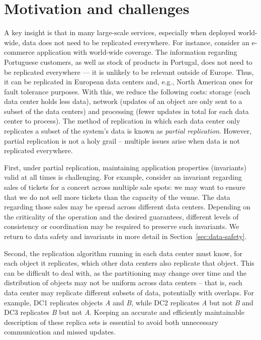 \section{Motivation and challenges}
A key insight is that in many large-scale services, especially when deployed world-wide,
data does not need to be replicated everywhere.
For instance, consider an e-commerce application with world-wide coverage.
The information regarding Portuguese customers, as well as stock of products in Portugal,
does not need to be replicated everywhere --- it is unlikely to be relevant outside of Europe.
Thus, it can be replicated in European data centers and, e.g., North American ones for fault tolerance purposes.
With this, we reduce the following costs: storage (each data center holds less data), network (updates of an object are only
sent to a subset of the data centers) and processing (fewer updates in total for each data center to process).
The method of replication in which each data center only replicates a subset of the system's data is known as
\emph{partial replication}.
However, partial replication is not a holy grail -- multiple issues arise when data is not replicated everywhere.

First, under partial replication, maintaining application properties (invariants) valid at all times is challenging.
For example, consider an invariant regarding sales of tickets for a concert across multiple sale spots: we may want to ensure that
we do not sell more tickets than the capacity of the venue.
The data regarding those sales may be spread across different data centers.
Depending on the criticality of the operation and the desired guarantees, different levels of consistency or coordination may be
required to preserve such invariants.
We return to data safety and invariants in more detail in Section~\ref{sec:data-safety}.%

Second, the replication algorithm running in each data center must know, for each
object it replicates, which other data centers also replicate that object.
This can be difficult to deal with, as the partitioning may change over time and the distribution of objects
may not be uniform across data centers -- that is, each data center may replicate different subsets of data, potentially
with overlaps.
For example, DC1 replicates objects \textit{A} and \textit{B}, while DC2 replicates \textit{A} but not \textit{B} and DC3 replicates \textit{B} but not \textit{A}.
Keeping an accurate and efficiently maintainable description of these replica sets is essential to avoid both unnecessary communication and missed updates.


